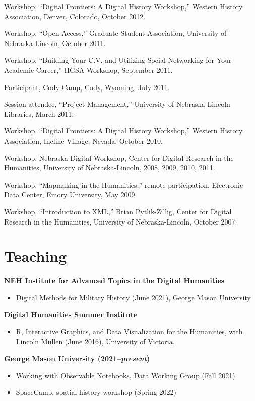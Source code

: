 Workshop, ``Digital Frontiers: A Digital History Workshop,'' Western
History Association, Denver, Colorado, October 2012.

Workshop, ``Open Access,'' Graduate Student Association, University of
Nebraska-Lincoln, October 2011.

Workshop, ``Building Your C.V. and Utilizing Social Networking for Your
Academic Career,'' HGSA Workshop, September 2011.

Participant, Cody Camp, Cody, Wyoming, July 2011.

Session attendee, ``Project Management,'' University of Nebraska-Lincoln
Libraries, March 2011.

Workshop, ``Digital Frontiers: A Digital History Workshop,'' Western
History Association, Incline Village, Nevada, October 2010.

Workshop, Nebraska Digital Workshop, Center for Digital Research in the
Humanities, University of Nebraska-Lincoln, 2008, 2009, 2010, 2011.

Workshop, ``Mapmaking in the Humanities,'' remote participation,
Electronic Data Center, Emory University, May 2009.

Workshop, ``Introduction to XML,'' Brian Pytlik-Zillig, Center for
Digital Research in the Humanities, University of Nebraska-Lincoln,
October 2007.

\hypertarget{teaching}{%
\section{Teaching}\label{teaching}}

\textbf{NEH Institute for Advanced Topics in the Digital Humanities}

\begin{itemize}
\tightlist
\item
  Digital Methods for Military History (June 2021), George Mason
  University
\end{itemize}

\textbf{Digital Humanities Summer Institute}

\begin{itemize}
\tightlist
\item
  R, Interactive Graphics, and Data Visualization for the Humanities,
  with Lincoln Mullen (June 2016), University of Victoria.
\end{itemize}

\textbf{George Mason University (2021--\emph{present})}

\begin{itemize}
\tightlist
\item
  Working with Observable Notebooks, Data Working Group (Fall 2021)
\item
  SpaceCamp, spatial history workshop (Spring 2022)
\end{itemize}

